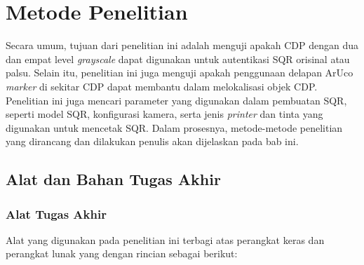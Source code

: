 \chapter{Metode Penelitian}
Secara umum, tujuan dari penelitian ini adalah menguji apakah CDP dengan dua dan empat level \emph{grayscale} dapat digunakan untuk autentikasi SQR orisinal
atau palsu. Selain itu, penelitian ini juga menguji apakah penggunaan delapan ArUco \emph{marker} di sekitar CDP dapat membantu dalam melokalisasi objek CDP.
Penelitian ini juga mencari parameter yang digunakan dalam pembuatan SQR, seperti model SQR, konfigurasi kamera, serta jenis \emph{printer} dan tinta yang
digunakan untuk mencetak SQR. Dalam prosesnya, metode-metode penelitian yang dirancang dan dilakukan penulis akan dijelaskan pada bab ini.

\section{Alat dan Bahan Tugas Akhir}

\subsection{Alat Tugas Akhir}

Alat yang digunakan pada penelitian ini terbagi atas perangkat keras dan perangkat lunak yang dengan rincian sebagai berikut:

